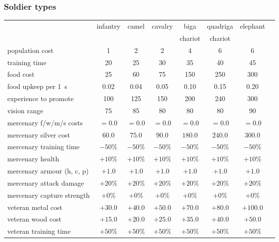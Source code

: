 \documentclass{article}
\begin{document}
\subsubsection{Soldier types}
\begin{tabular}{l|ccccccc}
                           & infantry & camel    & cavalry  & biga     & quadriga & elephant \\
                           &          &          &          & chariot  & chariot  &          \\
\hline
population cost            &     1    &     2    &     2    &     4    &     6    &     6    \\
training time              &    20    &    25    &    30    &    35    &    40    &    45    \\
food cost                  &    25    &    60    &    75    &   150    &   250    &   300    \\
food upkeep per 1~s        &     0.02 &     0.04 &     0.05 &     0.10 &     0.15 &     0.20 \\ 
experience to promote      &   100    &   125    &   150    &   200    &   240    &   300    \\
vision range               &    75    &    85    &    80    &    80    &    80    &    90    \\
\hline
mercenary f/w/m/s costs    &   $=0.0$ &   $=0.0$ &   $=0.0$ &   $=0.0$ &   $=0.0$ &   $=0.0$ \\
mercenary silver cost      &   $60.0$ &   $75.0$ &   $90.0$ &  $180.0$ &  $240.0$ &  $300.0$ \\ 
mercenary training time    &  $-50\%$ &  $-50\%$ &  $-50\%$ &  $-50\%$ &  $-50\%$ &  $-50\%$ \\
mercenary health           &  $+10\%$ &  $+10\%$ &  $+10\%$ &  $+10\%$ &  $+10\%$ &  $+10\%$ \\
mercenary armour (h, c, p) &   $+1.0$ &   $+1.0$ &   $+1.0$ &   $+1.0$ &   $+1.0$ &   $+1.0$ \\
mercenary attack damage    &  $+20\%$ &  $+20\%$ &  $+20\%$ &  $+20\%$ &  $+20\%$ &  $+20\%$ \\
mercenary capture strength &   $+0\%$ &   $+0\%$ &   $+0\%$ &   $+0\%$ &   $+0\%$ &   $+0\%$ \\
\hline
veteran metal cost         &  $+30.0$ &  $+40.0$ &  $+50.0$ &  $+70.0$ &  $+80.0$ & $+100.0$ \\
veteran wood cost          &  $+15.0$ &  $+20.0$ &  $+25.0$ &  $+35.0$ &  $+40.0$ &  $+50.0$ \\
veteran training time      &  $+50\%$ &  $+50\%$ &  $+50\%$ &  $+50\%$ &  $+50\%$ &  $+50\%$ \\

\end{tabular}
\end{document}
